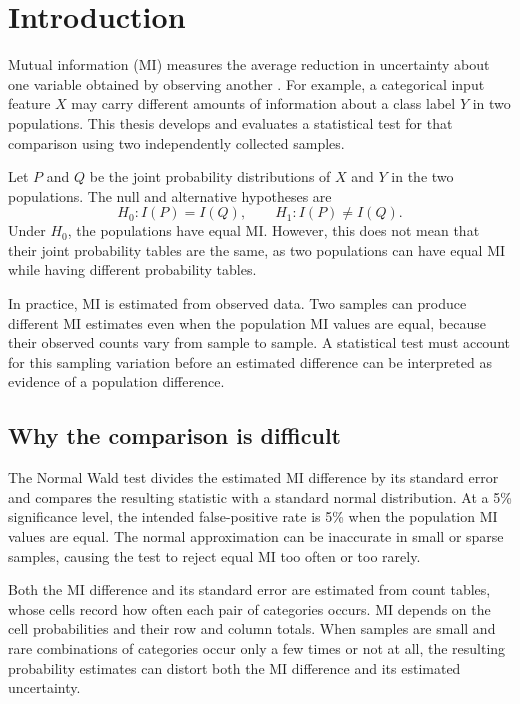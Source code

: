 \chapter{Introduction}
\label{chap:introduction}

Mutual information (MI) measures the average reduction in uncertainty about
one variable obtained by observing another \citep{bossomaier2016}.
For example, a categorical input feature
\(X\) may carry different amounts of information about a class label \(Y\) in two
populations. This thesis develops and evaluates a statistical test
for that comparison using two independently collected samples.

Let \(P\) and \(Q\) be the joint probability distributions of \(X\) and
\(Y\) in the two populations. The null and alternative hypotheses are
\begin{equation}
  H_0:I(P)=I(Q),
  \qquad H_1:I(P)\ne I(Q).
  \label{eq:introduction-null}
\end{equation}
Under \(H_0\), the populations have equal MI. However, this does not mean
that their joint probability tables are the same, as two populations can
have equal MI while having different probability tables.

In practice, MI is estimated from observed data. Two samples can produce
different MI estimates even when the population MI values are equal,
because their observed counts vary from sample to sample. A statistical
test must account for this sampling variation before an estimated
difference can be interpreted as evidence of a population difference.

\section{Why the comparison is difficult}

The Normal Wald test \citep{wald1943,vanderVaart1998} divides the estimated
MI difference by its standard error and compares the resulting statistic
with a standard normal distribution. At a 5\% significance level, the
intended false-positive rate is 5\% when the population MI values are
equal. The normal
approximation can be inaccurate in small or sparse samples, causing the
test to reject equal MI too often or too rarely.

Both the MI difference and its standard error are estimated from count
tables, whose cells record how often each pair of categories occurs.
MI depends on the cell probabilities and their row and column totals.
When samples are small and rare combinations of categories occur only a
few times or not at all, the resulting probability estimates can distort
both the MI difference and its estimated uncertainty.

